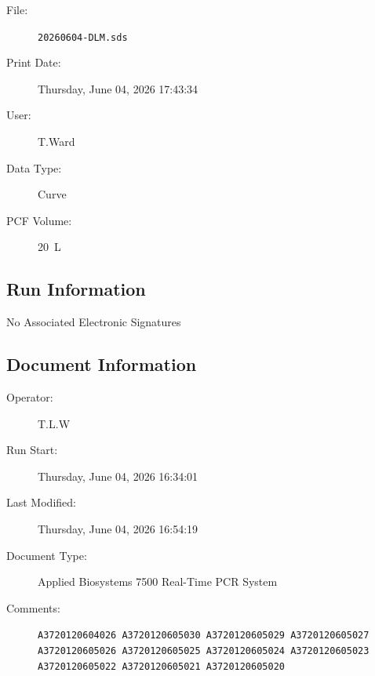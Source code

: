 \documentclass[UTF8,10pt,a4paper,fontset=fandol]{ctexart}
\newcommand{\fieldvalue}[1]{#1}
\begin{document}
\begin{description}
  \item[File:]%
  \fieldvalue{\texttt{20260604-DLM.sds}}

  \item[Print Date:]%
  \fieldvalue{Thursday, June 04, 2026 17:43:34}

  \item[User:]%
  \fieldvalue{T.Ward}

  \item[Data Type:]%
  \fieldvalue{Curve}

  \item[PCF Volume:]%
  \fieldvalue{20~\textmu L}
\end{description}

\subsection{Run Information}

No Associated Electronic Signatures

\subsection{Document Information}

\begin{description}
  \item[Operator:]%
  \fieldvalue{T.L.W}

  \item[Run Start:]%
  \fieldvalue{Thursday, June 04, 2026 16:34:01}

  \item[Last Modified:]%
  \fieldvalue{Thursday, June 04, 2026 16:54:19}

  \item[Document Type:]%
  \fieldvalue{Applied Biosystems 7500 Real-Time PCR System}

  \item[Comments:]%
  \fieldvalue{\texttt{A3720120604026 A3720120605030 A3720120605029 A3720120605027 A3720120605026 A3720120605025 A3720120605024 A3720120605023 A3720120605022 A3720120605021 A3720120605020}}
\end{description}
\end{document}
